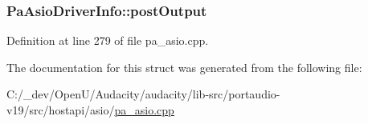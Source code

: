 \subsubsection[{\texorpdfstring{post\+Output}{postOutput}}]{ Pa\+Asio\+Driver\+Info\+::post\+Output}\hypertarget{struct_pa_asio_driver_info_a8570f0d4e09e8e76cc1d95a295210f19}{}\label{struct_pa_asio_driver_info_a8570f0d4e09e8e76cc1d95a295210f19}


Definition at line 279 of file pa\+\_\+asio.\+cpp.



The documentation for this struct was generated from the following file\+:\begin{DoxyCompactItemize}
\item 
C\+:/\+\_\+dev/\+Open\+U/\+Audacity/audacity/lib-\/src/portaudio-\/v19/src/hostapi/asio/\hyperlink{pa__asio_8cpp}{pa\+\_\+asio.\+cpp}\end{DoxyCompactItemize}

